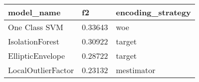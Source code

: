 \begin{tabular}{|l|l|l|}
\hline
\textbf{model\_name} & \textbf{f2} & \textbf{encoding\_strategy} \\ \hline
One Class SVM        & 0.33643     & woe                         \\ \hline
IsolationForest      & 0.30922     & target                      \\ \hline
EllipticEnvelope     & 0.28722     & target                      \\ \hline
LocalOutlierFactor   & 0.23132     & mestimator                  \\ \hline
\end{tabular}